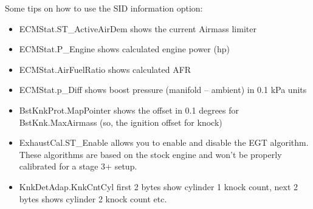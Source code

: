 \documentclass[11pt,a4paper]{book}
\begin{document}
Some tips on how to use the SID information option:
\begin{itemize}
    \item
ECMStat.ST\_ActiveAirDem shows the current Airmass limiter
    \item
ECMStat.P\_Engine shows calculated engine power (hp)
    \item
ECMStat.AirFuelRatio shows calculated AFR
    \item
ECMStat.p\_Diff shows boost pressure (manifold – ambient) in 0.1 kPa units
    \item
BstKnkProt.MapPointer shows the offset in 0.1 degrees for BstKnk.MaxAirmass (so, the
ignition offset for knock)
    \item
ExhaustCal.ST\_Enable allows you to enable and disable the EGT algorithm. These algorithms
are based on the stock engine and won’t be properly calibrated for a stage 3+ setup.
    \item
KnkDetAdap.KnkCntCyl first 2 bytes show cylinder 1 knock count, next 2 bytes shows cylinder
2 knock count etc.
\end{itemize}
\appendix
\printindex
\end{document}
